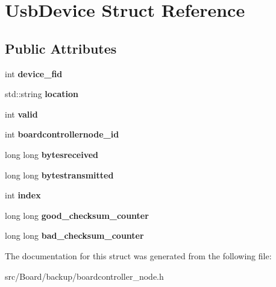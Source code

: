 \hypertarget{structUsbDevice}{}\section{Usb\+Device Struct Reference}
\label{structUsbDevice}
\subsection*{Public Attributes}
\begin{DoxyCompactItemize}
\item 
\mbox{\label{structUsbDevice_a8cfd7bea39745a2d000d65b6d4e49750}} 
int {\bfseries device\+\_\+fid}
\item 
\mbox{\label{structUsbDevice_a58169434b488215e01c235d978945907}} 
std\+::string {\bfseries location}
\item 
\mbox{\label{structUsbDevice_a0c3c1939c961a3ebf7160cd1cf0bb9f0}} 
int {\bfseries valid}
\item 
\mbox{\label{structUsbDevice_ad8a565261bf185ec96175254b9eb0d08}} 
int {\bfseries boardcontrollernode\+\_\+id}
\item 
\mbox{\label{structUsbDevice_ab6e3f29f0d47929ee5ecfd00657e5cb3}} 
long long {\bfseries bytesreceived}
\item 
\mbox{\label{structUsbDevice_a114a920eabfee6b205af9f88333f5d10}} 
long long {\bfseries bytestransmitted}
\item 
\mbox{\label{structUsbDevice_a19290b20066d2047b4d86a05903f00b2}} 
int {\bfseries index}
\item 
\mbox{\label{structUsbDevice_add07269837894fe36dacc12d86d7cfff}} 
long long {\bfseries good\+\_\+checksum\+\_\+counter}
\item 
\mbox{\label{structUsbDevice_a1b882242f8f9e1d1453d28414c18c2a6}} 
long long {\bfseries bad\+\_\+checksum\+\_\+counter}
\end{DoxyCompactItemize}


The documentation for this struct was generated from the following file\+:\begin{DoxyCompactItemize}
\item 
src/\+Board/backup/boardcontroller\+\_\+node.\+h\end{DoxyCompactItemize}
